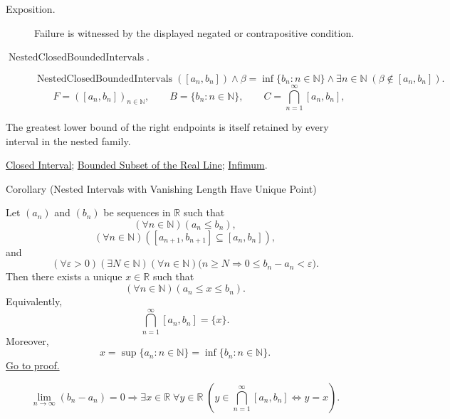 \begin{remark*}
\begin{description}
  \item[Exposition.]
  Failure is witnessed by the displayed negated or contrapositive condition.

  \item[\(\operatorname{NestedClosedBoundedIntervals}.\)]
  \[
\operatorname{NestedClosedBoundedIntervals}([a_n,b_n])
\land
\beta=\inf\{b_n:n\in\mathbb{N}\}
\land
\exists n\in\mathbb{N}\;(\beta\notin [a_n,b_n]).
\]
\[
F=([a_n,b_n])_{n\in\mathbb{N}},\qquad B=\{b_n:n\in\mathbb{N}\},\qquad
C=\bigcap_{n=1}^{\infty}[a_n,b_n],
\]
\end{description}
\end{remark*}

\begin{remark*}[Interpretation]
The greatest lower bound of the right endpoints is itself retained by every
interval in the nested family.
\end{remark*}

\begin{dependencies}
\hyperref[def:closed-interval]{Closed Interval};
\hyperref[def:bounded-subset-of-r]{Bounded Subset of the Real Line};
\hyperref[def:infimum]{Infimum}.
\end{dependencies}

\begin{corollarybox}{Corollary (Nested Intervals with Vanishing Length Have Unique Point)}
\begin{corollary}
\label{cor:nested-intervals-vanishing-length-have-unique-point}
Let $(a_n)$ and $(b_n)$ be sequences in $\mathbb{R}$ such that
\[
  (\forall n\in\mathbb{N})(a_n\leq b_n),
\]
\[
  (\forall n\in\mathbb{N})([a_{n+1},b_{n+1}]\subseteq [a_n,b_n]),
\]
and
\[
  (\forall\varepsilon>0)(\exists N\in\mathbb{N})(\forall n\in\mathbb{N})
  \bigl(n\geq N\Longrightarrow 0\leq b_n-a_n<\varepsilon\bigr).
\]
Then there exists a unique $x\in\mathbb{R}$ such that
\[
  (\forall n\in\mathbb{N})(a_n\leq x\leq b_n).
\]
Equivalently,
\[
  \bigcap_{n=1}^{\infty}[a_n,b_n]=\{x\}.
\]
Moreover,
\[
  x=\sup\{a_n:n\in\mathbb{N}\}=\inf\{b_n:n\in\mathbb{N}\}.
\]
\hyperref[prf:nested-intervals-vanishing-length-have-unique-point]{Go to proof.}
\end{corollary}
\end{corollarybox}

\begin{remark*}
\[
\lim_{n\longrightarrow\infty}(b_n-a_n)=0
\Longrightarrow
\exists x\in\mathbb{R}\;\forall y\in\mathbb{R}\;
\left(y\in\bigcap_{n=1}^{\infty}[a_n,b_n]\Longleftrightarrow y=x\right).
\]
\end{remark*}


